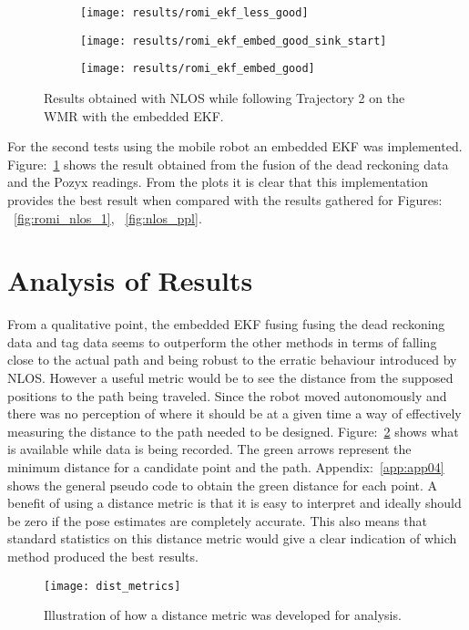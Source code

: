 \begin{figure}[ht!]
    \centering
    \begin{subfigure}{0.65\textwidth}
            \texttt{[image: results/romi\_ekf\_less\_good]}
    \end{subfigure}
    \begin{subfigure}{0.65\textwidth}
            \texttt{[image: results/romi\_ekf\_embed\_good\_sink\_start]}
    \end{subfigure}
    \begin{subfigure}{0.65\textwidth}
            \texttt{[image: results/romi\_ekf\_embed\_good]}
    \end{subfigure}
    \caption{Results obtained with NLOS while following Trajectory 2 on the WMR with the embedded EKF.}
    \label{fig:romi_nlos_ekf}
\end{figure}
For the second tests using the mobile robot an embedded EKF was implemented.
Figure:~\ref{fig:romi_nlos_ekf} shows the result obtained from the fusion of the dead reckoning data and the Pozyx readings.
From the plots it is clear that this implementation provides the best result when compared with the results gathered for Figures: ~\ref{fig:romi_nlos_1}, ~\ref{fig:nlos_ppl}.


\section{Analysis of Results}\label{sec:analysis-of-results}
From a qualitative point, the embedded EKF fusing fusing the dead reckoning data and tag data seems to outperform the other methods in terms of falling close to the actual path and being robust to the erratic behaviour introduced by NLOS.
However a useful metric would be to see the distance from the supposed positions to the path being traveled.
Since the robot moved autonomously and there was no perception of where it should be at a given time a way of effectively measuring the distance to the path needed to be designed.
Figure:~\ref{fig:dist} shows what is available while data is being recorded.
The green arrows represent the minimum distance for a candidate point and the path.
Appendix:~\ref{app:app04} shows the general pseudo code to obtain the green distance for each point.
A benefit of using a distance metric is that it is easy to interpret and ideally should be zero if the pose estimates are completely accurate.
This also means that standard statistics on this distance metric would give a clear indication of which method produced the best results.
\begin{figure}[ht!]
    \centering
    \texttt{[image: dist\_metrics]}
    \caption{Illustration of how a distance metric was developed for analysis.}
    \label{fig:dist}
\end{figure}

